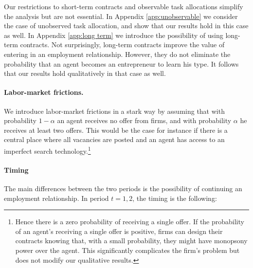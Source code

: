 \documentclass[12pt,american]{paper}
\theoremstyle{remark}
\begin{document}
Our restrictions to short-term contracts and observable task allocations simplify the analysis but are not essential. In Appendix \ref{app:unobservable}  we consider the case of unobserved task allocation, and show that our results hold in this case as well. In Appendix \ref{app:long term} we introduce the possibility of using long-term contracts. Not surprisingly, long-term contracts improve the value of entering in an employment relationship. However, they do not eliminate the probability that an agent becomes an entrepreneur to learn his type. It follows that our results hold qualitatively in that case as well.


\paragraph{Labor-market frictions.} 
We introduce labor-market frictions in a stark way by assuming that with probability $1-\alpha$ an agent receives no offer from firms, and with probability $\alpha$ he receives at least two offers. This would be the case for instance if there is a central place where all vacancies are posted and an agent  has access to an imperfect search technology.\footnote{Hence there is a zero probability of receiving a single offer. If the probability of an agent's receiving a single offer is positive, firms can design their contracts knowing that, with a small probability, they might have monopsony power over the agent. This significantly complicates the firm's problem but does not modify our qualitative results.}  

\paragraph{Timing}
The main differences between the two periods is the possibility of continuing an employment relationship.
In period $t=1,2$, the timing is the following:
\end{document}
